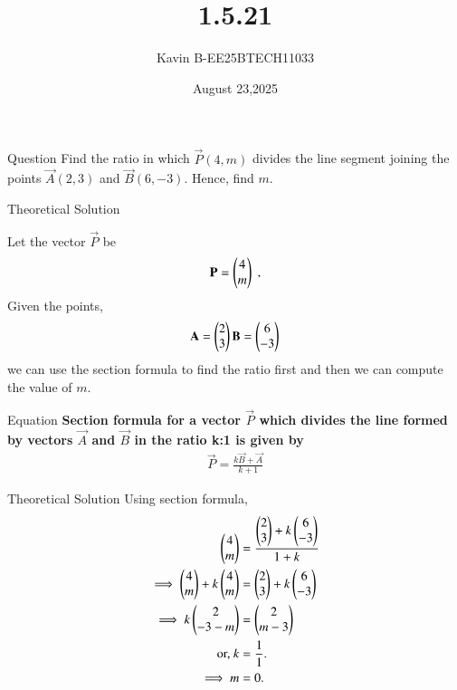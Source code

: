 \documentclass{beamer}
\title 
{1.5.21}
\date{August 23,2025}
\author 
{Kavin B-EE25BTECH11033}
\begin{document}
\frame{\titlepage}
\begin{frame}{Question}
Find the ratio in which $\vec{P}(4,m)$ divides the line segment joining the points $\vec{A}(2,3)$ and $\vec{B}(6,-3)$. Hence, find $m$.
\end{frame}



\begin{frame}{Theoretical Solution}

Let the vector $\vec{P}$ be 
\begin{align}
    \vec{P}=\begin{myvec}{4\\m}\end{myvec} \;, 
\end{align}
Given the points,
\begin{align}
    \vec{A}=\begin{myvec}{2\\3}\end{myvec}
    \vec{B}=\begin{myvec}{6\\-3}\end{myvec}
\end{align}
we can use the section formula to find the ratio first and then we can compute the value of $m$.\\

\end{frame}

\begin{frame}{Equation}
\textbf{Section formula for a vector $\vec{P}$ which divides the line formed by vectors $\vec{A}$ and $\vec{B}$ in the ratio k:1 is given by}
\begin{align}
    \vec{P}=\frac{k\vec{B}+\vec{A}}{k+1}
\end{align}
\end{frame}
\begin{frame}{Theoretical Solution}
Using section formula,\\
\begin{align}
         \begin{pmatrix}4\\m\end{pmatrix} &=\frac{{\begin{pmatrix}2\\3\end{pmatrix}+k\begin{pmatrix}6\\-3\end{pmatrix}}}{1+k}\\
    \implies\begin{pmatrix}4\\m\end{pmatrix} + k\begin{pmatrix}4\\m\end{pmatrix} &=\begin{pmatrix}2\\3\end{pmatrix}+k\begin{pmatrix}6\\-3\end{pmatrix}\\ 
	 \implies k\begin{pmatrix}2 \\ -3-m\end{pmatrix} &= \begin{pmatrix}2 \\ m-3\end{pmatrix}
	 \\
	 \text{or, } k &= \frac{1}{1}.\\
     \implies m &= 0.
\end{align}
\end{frame}
\end{document}
